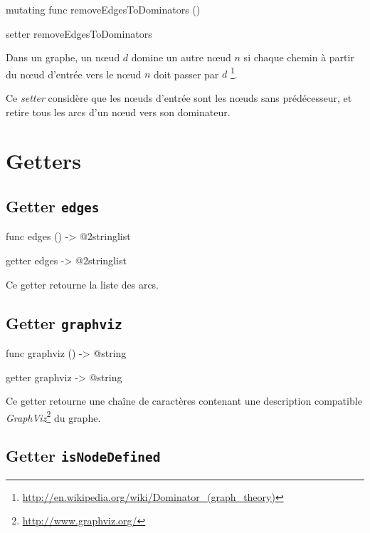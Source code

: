 \begin{galgas4}
mutating func removeEdgesToDominators ()
\end{galgas4}

\begin{galgas3}
setter removeEdgesToDominators
\end{galgas3}

Dans un graphe, un nœud $d$ domine un autre nœud $n$ si chaque chemin à partir du nœud d'entrée vers le nœud $n$ doit passer par $d$ \footnote{\url{http://en.wikipedia.org/wiki/Dominator_(graph_theory)}}.

Ce \emph{setter} considère que les nœuds d'entrée sont les nœuds sans prédécesseur, et retire tous les arcs d'un nœud vers son dominateur.

\section{Getters}

\subsection{Getter \texttt{edges}}

\begin{galgas4}
func edges () -> @2stringlist
\end{galgas4}

\begin{galgas3}
getter edges -> @2stringlist
\end{galgas3}

Ce getter retourne la liste des arcs.


\subsection{Getter \texttt{graphviz}}

\begin{galgas4}
func graphviz () -> @string
\end{galgas4}

\begin{galgas3}
getter graphviz -> @string
\end{galgas3}

Ce getter retourne une chaîne de caractères contenant une description compatible \emph{GraphViz}\footnote{\url{http://www.graphviz.org/}} du graphe.



\subsection{Getter \texttt{isNodeDefined}}

